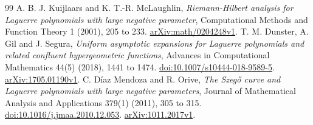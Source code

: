 \documentclass[11pt]{article}
\theoremstyle{definition}
\theoremstyle{remark}
\newcommand{\1}{\mathbf 1}
\begin{document}
\begin{thebibliography}{99}
A. B. J. Kuijlaars and K. T.-R. McLaughlin, \emph{Riemann-Hilbert analysis for Laguerre polynomials with large negative parameter}, Computational Methods and Function Theory 1 (2001), 205 to 233.
\href{https://arxiv.org/abs/math/0204248v1}{arXiv:math/0204248v1}.
T. M. Dunster, A. Gil and J. Segura, \emph{Uniform asymptotic expansions for Laguerre polynomials and related confluent hypergeometric functions}, Advances in Computational Mathematics 44(5) (2018), 1441 to 1474.
\href{https://doi.org/10.1007/s10444-018-9589-5}{doi:10.1007/s10444-018-9589-5}.
\href{https://arxiv.org/abs/1705.01190v1}{arXiv:1705.01190v1}.
C. D\'iaz Mendoza and R. Orive, \emph{The Szeg\H{o} curve and Laguerre polynomials with large negative parameters}, Journal of Mathematical Analysis and Applications 379(1) (2011), 305 to 315.
\href{https://doi.org/10.1016/j.jmaa.2010.12.053}{doi:10.1016/j.jmaa.2010.12.053}.
\href{https://arxiv.org/abs/1011.2017v1}{arXiv:1011.2017v1}.
\end{thebibliography}
\end{document}

